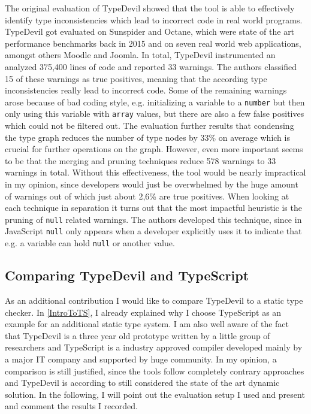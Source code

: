 \documentclass[runningheads,a4paper]{llncs}
\begin{document}
The original evaluation of TypeDevil showed that the tool is able to effectively identify type inconsistencies which lead to incorrect code in real world programs.
TypeDevil got evaluated on Sunspider and Octane, which were state of the art performance benchmarks back in 2015 and on seven real world web applications, amongst others Moodle and Joomla.
In total, TypeDevil instrumented an analyzed 375,400 lines of code and reported 33 warnings.
The authors classified 15 of these warnings as true positives, meaning that the according type inconsistencies really lead to incorrect code.
Some of the remaining warnings arose because of bad coding style, e.g. initializing a variable to a \lstinline[columns=fixed]{number} but then only using this variable with \lstinline[columns=fixed]{array} values, but there are also a few false positives which could not be filtered out.
The evaluation further results that condensing the type graph reduces the number of type nodes by 33\% on average which is crucial for further operations on the graph.
However, even more important seems to be that the merging and pruning techniques reduce 578 warnings to 33 warnings in total.
Without this effectiveness, the tool would be nearly impractical in my opinion, since developers would just be overwhelmed by the huge amount of warnings out of which just about 2,6\% are true positives. 
When looking at each technique in separation it turns out that the most impactful heuristic is the pruning of \lstinline[columns=fixed]{null} related warnings. 
The authors developed this technique, since in JavaScript \lstinline[columns=fixed]{null} only appears when a developer explicitly uses it to indicate that e.g. a variable can hold \lstinline[columns=fixed]{null} or another value.

\subsection{Comparing TypeDevil and TypeScript} \label{comparison}
As an additional contribution I would like to compare TypeDevil to a static type checker.
In \ref{IntroToTS}, I already explained why I choose TypeScript as an example for an additional static type system.
I am also well aware of the fact that TypeDevil is a three year old prototype written by a little group of researchers and TypeScript is a industry approved compiler developed mainly by a major IT company and supported by huge community.
In my opinion, a comparison is still justified, since the tools follow completely contrary approaches and TypeDevil is according to \cite{DBLP:conf/icse/TanXCLYS17} still considered the state of the art dynamic solution.
In the following, I will point out the evaluation setup I used and present and comment the results I recorded. 
\end{document}
